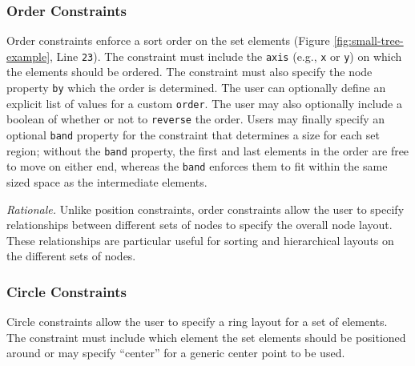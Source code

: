 
\subsubsection{Order Constraints}
 Order constraints enforce a sort order on the set
elements (Figure \ref{fig:small-tree-example}, Line \texttt{23}). The
constraint must include the \texttt{axis} (e.g., \texttt{x} or \texttt{y})
on which the elements should be ordered. The constraint must also specify
the node property \texttt{by} which the order is determined. The user can
optionally define an explicit list of values for a custom
\texttt{order}. The user may also optionally include a boolean of whether
or not to \texttt{reverse} the order. Users may finally specify an optional
\texttt{band} property for the constraint that determines a size for each
set region; without the \texttt{band} property, the first and last elements
in the order are free to move on either end, whereas the \texttt{band}
enforces them to fit within the same sized space as the intermediate
elements. 


\emph{Rationale.} Unlike position constraints, order constraints allow the
user to specify relationships between different sets of nodes to specify
the overall node layout. These relationships are particular useful for
sorting and hierarchical layouts on the different sets of nodes.

\subsubsection{Circle Constraints}
 Circle
constraints allow the user to specify a ring layout for a set of
elements. The constraint must include which element the set elements should
be positioned around or may specify ``center'' for a generic center point
to be used.


